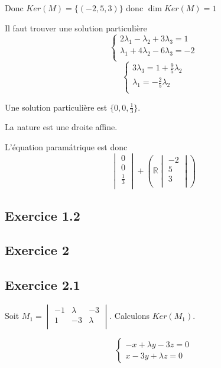 \documentclass[]{book}
\theoremstyle{definition}
\newcommand{\bb}[1]{\mathbb{#1}}
\newcommand{\R}{\bb{R}}
\begin{document}
Donc $Ker(M) = \{(-2, 5, 3)\}$ donc $\dim Ker(M) = 1$

Il faut trouver une solution particuli\`ere
$$
\left\{ 
    \begin{array}{l}
        2\lambda_1 - \lambda_2 + 3 \lambda_3 = 1 \\
        \lambda_1 + 4 \lambda_2 - 6\lambda_3 = -2 \\
    \end{array}
\right.
$$
$$
\left\{ 
    \begin{array}{l}
        3\lambda_3 = 1 + \frac{9}{5}\lambda_2 \\
        \lambda_1 = - \frac{2}{5}\lambda_2 \\
    \end{array}
\right.
$$

Une solution particuli\`ere est $\{0,0,\frac{1}{3}\}$. 

La nature est une droite affine.

L'\'equation param\'atrique est donc
$$
\begin{vmatrix}
    0 \\
    0 \\
    \frac{1}{3} \\
\end{vmatrix}
+
(\R\begin{vmatrix}
   -2 \\
   5 \\
   3 \\ 
\end{vmatrix})
$$

\subsection*{Exercice 1.2}

\subsection*{Exercice 2}
\subsection*{Exercice 2.1}
Soit $M_1=\begin{vmatrix}
    -1 & \lambda & -3 \\
    1 & -3 & \lambda \\
\end{vmatrix}$. Calculons $Ker(M_1)$.

$$
\left\{ 
    \begin{array}{l}
        -x + \lambda y - 3 z = 0 \\
        x - 3 y + \lambda z = 0
    \end{array}
\right.
$$
\end{document}

